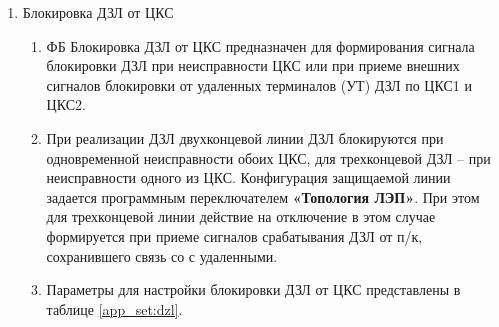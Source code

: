 \begin{enumerate}
\item Блокировка ДЗЛ от ЦКС
\begin{enumerate}
\item ФБ Блокировка ДЗЛ от ЦКС предназначен для формирования сигнала блокировки ДЗЛ при неисправности ЦКС или при приеме внешних сигналов блокировки от удаленных терминалов (УТ) ДЗЛ по ЦКС1 и ЦКС2.
\item При реализации ДЗЛ двухконцевой линии ДЗЛ блокируются при одновременной неисправности обоих ЦКС, для трехконцевой ДЗЛ – при неисправности одного из ЦКС. Конфигурация защищаемой линии задается программным переключателем \textbf{«Топология ЛЭП»}. При этом для трехконцевой линии действие на отключение в этом случае формируется при приеме сигналов срабатывания ДЗЛ от п/к, сохранившего связь со с удаленными.
\item Параметры для настройки блокировки ДЗЛ от ЦКС представлены в таблице \ref{app_set:dzl}.
\end{enumerate}


\end{enumerate}
